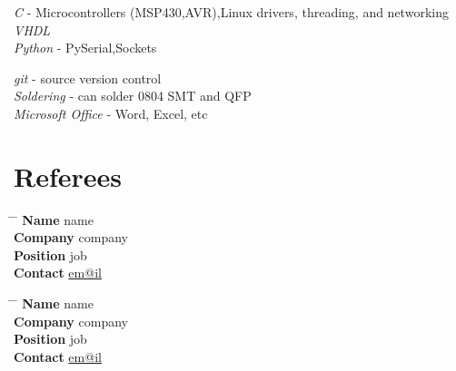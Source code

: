 \documentclass[10pt]{article} %
\begin{document}
{
\textit{C} - Microcontrollers (MSP430,AVR),Linux drivers, threading, and networking\\
\textit{VHDL}\\
\textit{Python} - PySerial,Sockets
}


{
\textit{git} - source version control\\
\textit{Soldering} - can solder 0804 SMT and QFP\\
\textit{Microsoft Office} - Word, Excel, etc
}


\section{Referees}

\parbox{0.5\textwidth}{ %
\begin{tabbing}
\hspace{2.75cm} \= \hspace{4cm} \= \kill %
{\bf Name} \> name \\ %
{\bf Company} \> company \\ %
{\bf Position} \> job \\ %
{\bf Contact} \> \href{mailto:em@il}{em@il} %
\end{tabbing}}
\hfill %
\parbox{0.5\textwidth}{ %
\begin{tabbing}
\hspace{2.75cm} \= \hspace{4cm} \= \kill %
{\bf Name} \> name\\ %
{\bf Company} \> company \\ %
{\bf Position} \> job \\ %
{\bf Contact} \> \href{mailto:em@il}{em@il} %
\end{tabbing}}

\end{document}
